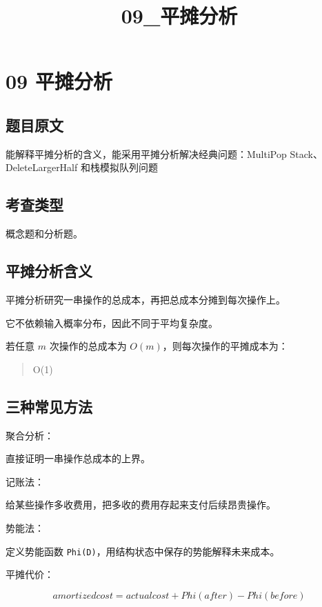 \documentclass[UTF8,zihao=-4]{ctexart}
\title{09\_平摊分析}
\author{}
\date{}
\begin{document}
\maketitle

\section*{09 平摊分析}

\subsection*{题目原文}

能解释平摊分析的含义，能采用平摊分析解决经典问题：MultiPop Stack、DeleteLargerHalf 和栈模拟队列问题

\subsection*{考查类型}

概念题和分析题。

\subsection*{平摊分析含义}

平摊分析研究一串操作的总成本，再把总成本分摊到每次操作上。

它不依赖输入概率分布，因此不同于平均复杂度。

若任意 $m$ 次操作的总成本为 $O(m)$，则每次操作的平摊成本为：

\begin{quote}
\small\ttfamily\raggedright
\relax O(1)\\
\end{quote}

\subsection*{三种常见方法}

聚合分析：

直接证明一串操作总成本的上界。

记账法：

给某些操作多收费用，把多收的费用存起来支付后续昂贵操作。

势能法：

定义势能函数 \texttt{Phi(D)}，用结构状态中保存的势能解释未来成本。

平摊代价：

\[amortized cost = actual cost + Phi(after) - Phi(before)\]
\end{document}
